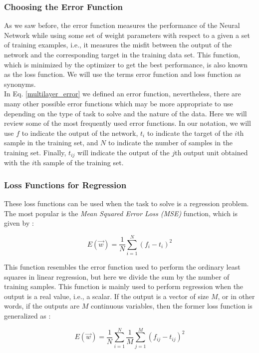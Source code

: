 \subsubsection{Choosing the Error Function}
As we saw before, the error function measures the performance of the Neural Network while using some set of weight parameters with respect to a given a set of training examples, i.e., it measures the misfit between the output of the network and the corresponding target in the training data set. This function, which is minimized by the optimizer to get the best performance, is also known as the loss function. We will use the terms error function and loss function as synonyms.\\

In Eq. \ref{multilayer_error} we defined an error function, nevertheless, there are many other possible error functions which may be more appropriate to use depending on the type of task to solve and the nature of the data. Here we will review some of the most frequently used error functions. In our notation, we will use $f$ to indicate the output of the network, $t_{i}$ to indicate the target of the $i$th sample in the training set, and $N$ to indicate the number of samples in the training set. Finally, $t_{ij}$ will indicate the output of the $j$th output unit obtained with the $i$th sample of the training set.

\subsubsection*{Loss Functions for Regression}
These loss functions can be used when the task to solve is a regression problem. The most popular is the \textit{Mean Squared Error Loss (MSE)} function, which is given by \cite{deep_learning}:

\begin{equation}
\label{MSE}
	E(\vec{w})=\frac{1}{N} \sum_{i =1}^{N} (f_{i}-t_{i})^{2}
\end{equation}

This function resembles the error function used to perform the ordinary least squares in linear regression, but here we divide the sum by the number of training samples. This function is mainly used to perform regression when the output is a real value, i.e., a scalar. If the output is a vector of size $M$, or in other words, if the outputs are $M$ continuous variables, then the former loss function is generalized as \cite{deep_learning}:

\begin{equation}
	E(\vec{w})=\frac{1}{N} \sum_{i =1}^{N} \frac{1}{M}  \sum_{j =1}^{M} (f_{ij}-t_{ij})^{2}
\end{equation}

